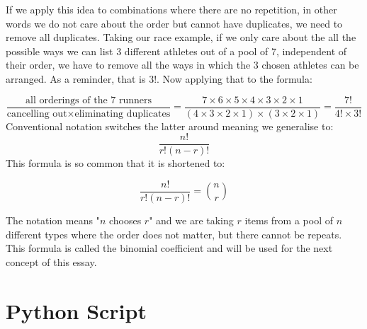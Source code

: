 \documentclass[12pt, a4paper]{article}   %
\begin{document}
If we apply this idea to combinations where there are no repetition, in other words we do not care about the order but cannot have duplicates, we need to remove all duplicates. Taking our race example, if we only care about the all the possible ways we can list 3 different athletes out of a pool of 7, independent of their order, we have to remove all the ways in which the 3 chosen athletes can be arranged. As a reminder, that is \(3!\). Now applying that to the formula:

\[ \frac{\text{all orderings of the 7 runners}}{\text{cancelling out} \times \text{eliminating duplicates} } = \frac{7 \times 6 \times 5 \times 4 \times 3 \times 2 \times 1}{ (4 \times 3 \times 2 \times 1) \times (3 \times 2 \times 1)} = \frac{7!}{4! \times 3!} \]
Conventional notation switches the latter around meaning we generalise to:
\[ \frac{n!}{r!(n-r)!} \]
This formula is so common that it is shortened to:

\begin{equation} \label{eq:binomial-coefficient}
    \frac{n!}{r!(n-r)!} = \binom{n}{r}
\end{equation}

The notation means "\(n\) chooses \(r\)" and we are taking \(r\) items from a pool of \(n\) different types where the order does not matter, but there cannot be repeats. This formula is called the binomial coefficient and will be used for the next concept of this essay.



\section{Python Script} \label{app:python-script}


\end{document}
